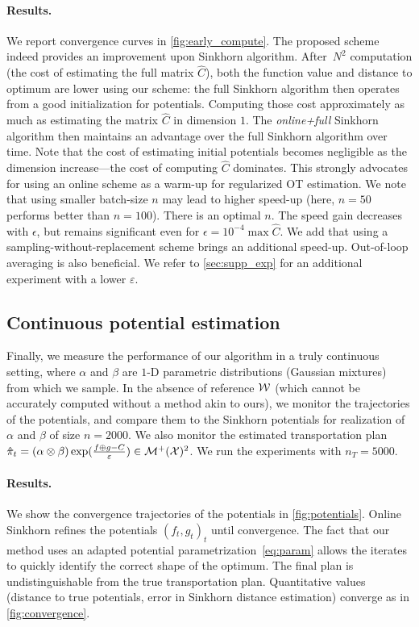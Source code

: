 \paragraph{Results.} We report convergence curves in
\autoref{fig:early_compute}. The proposed scheme indeed provides an improvement
upon Sinkhorn algorithm. After $N^2$ computation (the cost of estimating the
full matrix $\hat C$), both the function value and distance to optimum are lower
using our scheme: the full Sinkhorn algorithm then operates from a good
initialization for potentials. Computing those cost approximately as much as
estimating the matrix $\hat C$ in dimension $1$. The \textit{online+full}
Sinkhorn algorithm then maintains an advantage over the full Sinkhorn algorithm
over time. Note that the cost of estimating initial potentials becomes negligible
as the dimension increase---the cost of computing $\hat C$ dominates. This
strongly advocates for using an online scheme as a warm-up for regularized OT
estimation. We note that using smaller batch-size $n$ may lead to higher speed-up (here, $n=50$ performs better than $n=100$).
There is an optimal $n$. The speed gain decreases with $\epsilon$, but remains
significant even for $\epsilon = 10^{-4} \max \hat C$. We add that
using a sampling-without-replacement scheme brings an additional speed-up. Out-of-loop averaging is also beneficial. We refer to \autoref{sec:supp_exp} for an additional experiment with a lower $\varepsilon$.

\subsection{Continuous potential estimation}

Finally, we measure the performance of our algorithm in a truly continuous
setting, where $\alpha$ and $\beta$ are $1$-D parametric distributions (Gaussian
mixtures) from which we sample. In the absence of reference $\mathcal{W}$ (which cannot be accurately computed
without a method akin to ours), we monitor the
trajectories of the potentials, and compare them to the Sinkhorn potentials for
realization of $\alpha$ and $\beta$ of size $n=2000$. We also monitor the
estimated transportation plan $\hat \pi_t = (\alpha \otimes \beta)
\exp(\frac{f\oplus g - C}{\varepsilon}) \in \mathcal{M}^+(\mathcal{X})^2$. We run the experiments with
$n_T=5000$.

\paragraph{Results.} We show the convergence trajectories of the potentials in
\autoref{fig:potentials}. Online Sinkhorn refines the potentials $(f_t, g_t)_t$ until convergence. The fact that our method uses an adapted potential parametrization~\eqref{eq:param}
allows the iterates to quickly identify the correct shape of the optimum. The
final plan is undistinguishable from the true transportation plan. Quantitative
values (distance to true potentials, error in Sinkhorn distance estimation) converge as in
\autoref{fig:convergence}.


